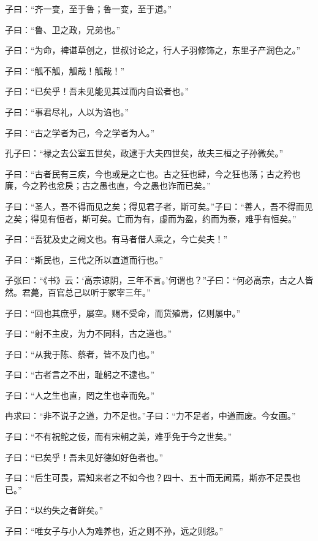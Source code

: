 \documentclass[a5paper]{ctexbook}
\begin{document}
    子曰：“齐一变，至于鲁；鲁一变，至于道。”

    子曰：“鲁、卫之政，兄弟也。”

    子曰：“为命，裨谌草创之，世叔讨论之，行人子羽修饰之，东里子产润色之。”

    子曰：“觚不觚，觚哉！觚哉！”

    子曰：“已矣乎！吾未见能见其过而内自讼者也。”

    子曰：“事君尽礼，人以为谄也。”

    子曰：“古之学者为己，今之学者为人。”

    孔子曰：“禄之去公室五世矣，政逮于大夫四世矣，故夫三桓之子孙微矣。”

    子曰：“古者民有三疾，今也或是之亡也。古之狂也肆，今之狂也荡；古之矜也廉，今之矜也忿戾；古之愚也直，今之愚也诈而已矣。”

    子曰：“圣人，吾不得而见之矣；得见君子者，斯可矣。”子曰：“善人，吾不得而见之矣；得见有恒者，斯可矣。亡而为有，虚而为盈，约而为泰，难乎有恒矣。”

    子曰：“吾犹及史之阙文也。有马者借人乘之，今亡矣夫！”

    子曰：“斯民也，三代之所以直道而行也。”

    子张曰：“《书》云：‘高宗谅阴，三年不言。’何谓也？”子曰：“何必高宗，古之人皆然。君薨，百官总己以听于冢宰三年。”

    子曰：“回也其庶乎，屡空。赐不受命，而货殖焉，亿则屡中。”

    子曰：“射不主皮，为力不同科，古之道也。”

    子曰：“从我于陈、蔡者，皆不及门也。”

    子曰：“古者言之不出，耻躬之不逮也。”

    子曰：“人之生也直，罔之生也幸而免。”

    冉求曰：“非不说子之道，力不足也。”子曰：“力不足者，中道而废。今女画。”

    子曰：“不有祝𬶍之佞，而有宋朝之美，难乎免于今之世矣。”

    子曰：“已矣乎！吾未见好德如好色者也。”

    子曰：“后生可畏，焉知来者之不如今也？四十、五十而无闻焉，斯亦不足畏也已。”

    子曰：“以约失之者鲜矣。”

    子曰：“唯女子与小人为难养也，近之则不孙，远之则怨。”

    \chapter{}
\end{document}
